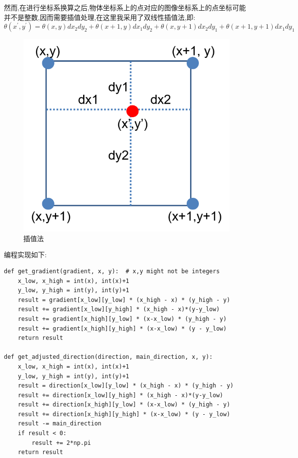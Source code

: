 \documentclass[a4paper]{article}
\begin{document}
然而,在进行坐标系换算之后,物体坐标系上的点对应的图像坐标系上的点坐标可能并不是整数,因而需要插值处理,在这里我采用了双线性插值法,即:
$$\theta(x^{'} , y^{'}) = \theta(x,y)dx_2 dy_2 + \theta(x+1,y)dx_1 dy_2 + \theta(x,y+1)dx_2 dy_1
+ \theta(x+1,y+1)dx_1 dy_1$$
\begin{figure}[H]
\centering
\includegraphics[width=.6\textwidth]{img/1.png}
\caption{插值法}
\end{figure}
编程实现如下:
\begin{verbatim}
def get_gradient(gradient, x, y):  # x,y might not be integers
    x_low, x_high = int(x), int(x)+1
    y_low, y_high = int(y), int(y)+1
    result = gradient[x_low][y_low] * (x_high - x) * (y_high - y)
    result += gradient[x_low][y_high] * (x_high - x)*(y-y_low)
    result += gradient[x_high][y_low] * (x-x_low) * (y_high - y)
    result += gradient[x_high][y_high] * (x-x_low) * (y - y_low)
    return result

def get_adjusted_direction(direction, main_direction, x, y):
    x_low, x_high = int(x), int(x)+1
    y_low, y_high = int(y), int(y)+1
    result = direction[x_low][y_low] * (x_high - x) * (y_high - y)
    result += direction[x_low][y_high] * (x_high - x)*(y-y_low)
    result += direction[x_high][y_low] * (x-x_low) * (y_high - y)
    result += direction[x_high][y_high] * (x-x_low) * (y - y_low)
    result -= main_direction
    if result < 0:
        result += 2*np.pi
    return result
\end{verbatim}
\end{document}
